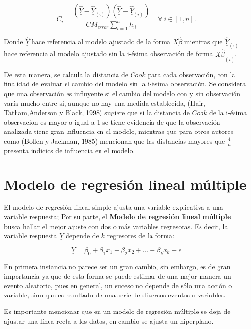 \documentclass[
  a4paper,
  oneside,
  openany]{book}
\begin{document}
\[C_{i}=\frac{\left(\underline{\hat{Y}}-\underline{\hat{Y}}_{(i)}\right)\left(\underline{\hat{Y}}-\underline{\hat{Y}}_{(i)}\right)}{CM_{error}\sum_{i=1}^{n}h_{ii}} \ \ \ \ \  \forall \ i \in [1,n].\]

Donde \(\underline{\hat{Y}}\) hace referencia al modelo ajustado de la forma \(X\underline{\hat{\beta}}\) mientras que \(\underline{\hat{Y}}_{(i)}\) hace referencia al modelo ajustado sin la i-ésima observación de forma \(X\underline{\hat{\beta}}_{(i)}\).

De esta manera, se calcula la distancia de \(Cook\) para cada observación, con la finalidad de evaluar el cambio del modelo sin la i-ésima observación. Se considera que una observación es influyente si el cambio del modelo con y sin observación varía mucho entre si, aunque no hay una medida establecida, (Hair, Tatham,Anderson y Black, 1998) sugiere que si la distancia de \(Cook\) de la i-ésima observación es mayor o igual a 1 se tiene evidencia de que la observación analizada tiene gran influencia en el modelo, mientras que para otros autores como (Bollen y Jackman, 1985) mencionan que las distancias mayores que \(\frac{4}{n}\) presenta indicios de influencia en el modelo.

\hypertarget{modelo-de-regresiuxf3n-lineal-muxfaltiple}{%
\chapter*{Modelo de regresión lineal múltiple}\label{modelo-de-regresiuxf3n-lineal-muxfaltiple}}


El modelo de regresión lineal simple ajusta una variable explicativa a una variable respuesta; Por su parte, el \textbf{Modelo de regresión lineal múltiple} busca hallar el mejor ajuste con dos o más variables regresoras. Es decir, la variable respuesta \(\underline{Y}\) depende de \(k\) regresores de la forma:

\[
\underline{Y}=\beta_{0}+\beta_{1}x_{1}+\beta_{2}x_{2}+ \ldots +\beta_{k}x_{k}+\epsilon
\]

En primera instancia no parece ser un gran cambio, sin embargo, es de gran importancia ya que de esta forma se puede estimar de una mejor manera un evento aleatorio, pues en general, un suceso no depende de sólo una acción o variable, sino que es resultado de una serie de diversos eventos o variables.

Es importante mencionar que en un modelo de regresión múltiple se deja de ajustar una línea recta a los datos, en cambio se ajusta un hiperplano.
\end{document}
